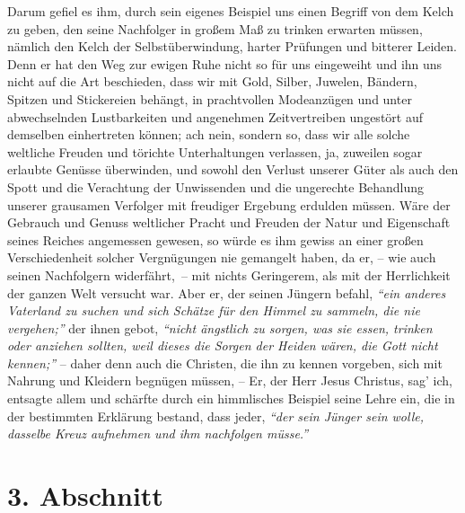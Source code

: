 Darum gefiel es ihm, durch sein eigenes Beispiel uns einen Begriff von dem
Kelch zu geben, den seine Nachfolger in großem Maß zu
trinken erwarten müssen,
nämlich den Kelch der Selbstüberwindung,
harter Prüfungen und bitterer Leiden.
Denn er hat den Weg zur ewigen Ruhe nicht so für uns
eingeweiht und ihn uns
nicht auf die Art beschieden, dass wir mit Gold, Silber, Juwelen, Bändern,
Spitzen und Stickereien behängt, in prachtvollen Modeanzügen und unter
abwechselnden Lustbarkeiten und angenehmen Zeitvertreiben ungestört auf
demselben einhertreten können; ach nein, sondern so, dass wir alle solche
weltliche Freuden und törichte Unterhaltungen verlassen, ja, zuweilen sogar
erlaubte Genüsse überwinden,
und sowohl den Verlust unserer Güter als auch den
Spott und die Verachtung der Unwissenden und die ungerechte Behandlung unserer
grausamen Verfolger mit freudiger Ergebung erdulden
müssen.
Wäre der Gebrauch und Genuss weltlicher Pracht und Freuden der Natur
und Eigenschaft seines Reiches angemessen gewesen, so würde es ihm gewiss an
einer großen Verschiedenheit solcher Vergnügungen nie gemangelt haben, da er, --
wie auch seinen Nachfolgern widerfährt,~-- mit nichts Geringerem, als mit der
Herrlichkeit der ganzen Welt versucht war. Aber er, der seinen Jüngern befahl,
\textit{"`ein anderes Vaterland zu suchen und sich Schätze für den Himmel zu
sammeln, die nie vergehen;"'} der ihnen gebot,
\textit{"`nicht ängstlich zu sorgen, was sie essen,
trinken oder anziehen sollten, weil dieses die Sorgen der Heiden wären,
die Gott nicht kennen;"'} -- daher denn auch die Christen, die ihn zu kennen
vorgeben, sich mit Nahrung und Kleidern begnügen müssen,
-- Er, der Herr Jesus Christus, sag’ ich, entsagte allem und schärfte
durch ein himmlisches Beispiel seine Lehre ein, die in der bestimmten Erklärung
bestand, dass jeder,
\textit{"`der sein Jünger sein wolle, dasselbe Kreuz aufnehmen und
ihm nachfolgen müsse."'}

\section{3. Abschnitt} \label{kap16_ab3}


